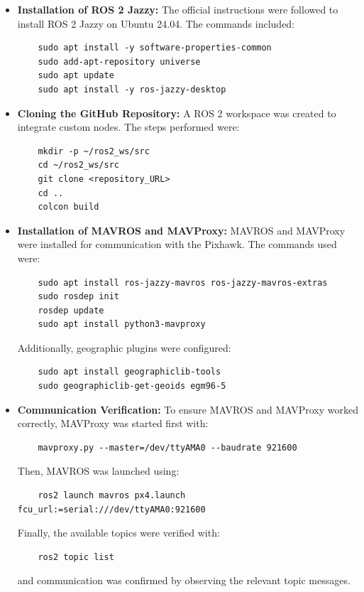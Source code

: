 \begin{itemize}
    \item \textbf{Installation of ROS 2 Jazzy:} 
    The official instructions were followed to install ROS 2 Jazzy on Ubuntu 24.04. The commands included:
    \begin{verbatim}
    sudo apt install -y software-properties-common
    sudo add-apt-repository universe
    sudo apt update
    sudo apt install -y ros-jazzy-desktop
    \end{verbatim}
    
    \item \textbf{Cloning the GitHub Repository:} 
    A ROS 2 workspace was created to integrate custom nodes. The steps performed were:
    \begin{verbatim}
    mkdir -p ~/ros2_ws/src
    cd ~/ros2_ws/src
    git clone <repository_URL>
    cd ..
    colcon build
    \end{verbatim}
    
    \item \textbf{Installation of MAVROS and MAVProxy:} 
    MAVROS and MAVProxy were installed for communication with the Pixhawk. The commands used were:
    \begin{verbatim}
    sudo apt install ros-jazzy-mavros ros-jazzy-mavros-extras
    sudo rosdep init
    rosdep update
    sudo apt install python3-mavproxy
    \end{verbatim}
    Additionally, geographic plugins were configured:
    \begin{verbatim}
    sudo apt install geographiclib-tools
    sudo geographiclib-get-geoids egm96-5
    \end{verbatim}
    
    \item \textbf{Communication Verification:} 
    To ensure MAVROS and MAVProxy worked correctly, MAVProxy was started first with:
    \begin{verbatim}
    mavproxy.py --master=/dev/ttyAMA0 --baudrate 921600
    \end{verbatim}
    Then, MAVROS was launched using:
    \begin{verbatim}
    ros2 launch mavros px4.launch fcu_url:=serial:///dev/ttyAMA0:921600
    \end{verbatim}
    Finally, the available topics were verified with:
    \begin{verbatim}
    ros2 topic list
    \end{verbatim}
    and communication was confirmed by observing the relevant topic messages.
    
    
\end{itemize}
    
